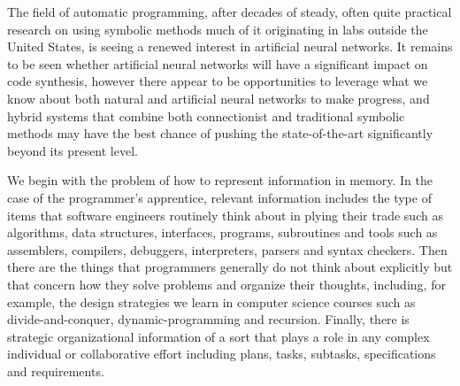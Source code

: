 The field of automatic programming, after decades of steady, often quite practical research on using symbolic methods \emdash{} much of it originating in labs outside the United States, is seeing a renewed interest in artificial neural networks. It remains to be seen whether artificial neural networks will have a significant impact on code synthesis, however there appear to be opportunities to leverage what we know about both natural and artificial neural networks to make progress, and hybrid systems that combine both connectionist and traditional symbolic methods may have the best chance of pushing the state-of-the-art significantly beyond its present level.




We begin with the problem of how to represent information in memory. In the case of the programmer's apprentice, relevant information includes the type of items that software engineers routinely think about in plying their trade such as algorithms, data structures, interfaces, programs, subroutines and tools such as assemblers, compilers, debuggers, interpreters, parsers and syntax checkers. Then there are the things that programmers generally do not think about explicitly but that concern how they solve problems and organize their thoughts, including, for example, the design strategies we learn in computer science courses such as divide-and-conquer, dynamic-programming and recursion. Finally, there is strategic organizational information of a sort that plays a role in any complex individual or collaborative effort including plans, tasks, subtasks, specifications and requirements.

